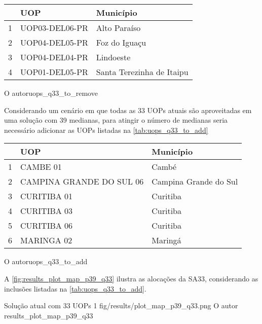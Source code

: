 
{\begin{tabular}{l|l|l}\hline
   & UOP  &  Município \\ \hline\hline
1 & UOP03-DEL06-PR &              Alto Paraíso \\
2 & UOP04-DEL05-PR &             Foz do Iguaçu \\
3 & UOP04-DEL04-PR &                 Lindoeste \\
4 & UOP01-DEL05-PR & Santa Terezinha de Itaipu \\
 \hline
\end{tabular}}
{O autor}{uops_q33_to_remove}{}{}

Considerando um cenário em que todas as 33 UOPs atuais são aproveitadas em uma solução com 39 medianas, para atingir o número de medianas seria necessário adicionar as UOPs listadas na \autoref{tab:uops_q33_to_add}

{\begin{tabular}{l|l|l}\hline
   & UOP  &  Município \\ \hline\hline
1 &                 CAMBE 01 &                 Cambé \\
2 & CAMPINA GRANDE DO SUL 06 & Campina Grande do Sul \\
3 &              CURITIBA 01 &              Curitiba \\
4 &              CURITIBA 03 &              Curitiba \\
5 &              CURITIBA 06 &              Curitiba \\
6 &               MARINGA 02 &               Maringá \\
 \hline
\end{tabular}}
{O autor}{uops_q33_to_add}{}{}

A \autoref{fig:results_plot_map_p39_q33} ilustra as alocações da SA33, considerando as inclusões listadas na \autoref{tab:uops_q33_to_add}.

\figurah
{Solução atual com 33 UOPs}
{1}
{fig/results/plot_map_p39_q33.png}
{O autor}
{results_plot_map_p39_q33}
{}
{}

